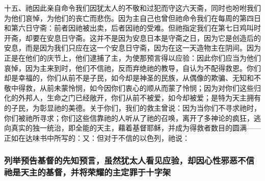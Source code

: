 十五、祂因此亲自命令我们因犹太人的不敬和过犯而守这六天斋，同时也吩咐我们为他们哀悼，为他们的丧亡而悲伤。因为主自己也曾但祂命令我们在每周的第四日和第六日守斋：前者因祂被出卖，后者因祂的受难。但祂指定我们在第七日鸡叫时开斋，却要在安息日守斋。这并不是因为安息日本是守斋之日，因为它是创造后的安息，而是因为我们只应在这一个安息日守斋，因为在这一天造物主在阴间。因为正是在他们的庆节上，他们逮捕了主，为使那预言得以应验：因此你们应当为他们哀悼，因为主来到时，他们不信祂，反而弃绝祂的教导，自认为不配得救恩。你们却是幸福的，你们从前不是子民，如今却是神圣的民族，从偶像的欺骗、无知和不敬中得救，从前未蒙怜悯，如今因你们衷心的顺从而蒙了怜悯；因为对你们这些归化的外邦人，生命之门已经敞开，你们从前不被爱，如今却被爱；是特为天主拥有的子民，为彰显祂的美德。关于你们，我们的救主曾说：因为当你们不寻求祂时，你们被祂所寻求；你们这些信靠祂的人听从了祂的召唤，离开了多神论的疯狂，逃向真实的独一统治，即全能的天主，藉着基督耶稣，并成为得救者数目的圆满—— 正如在达味书中所写的：又：但对于不信的以色列，祂说：\par


\subsubsection{列举预告基督的先知预言，虽然犹太人看见应验，却因心性邪恶不信祂是天主的基督，并将荣耀的主定罪于十字架}

